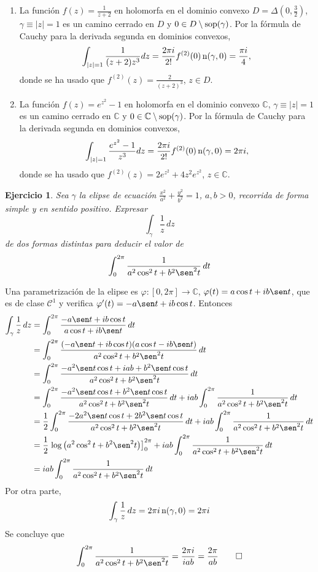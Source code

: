 \documentclass[11pt]{report}
\makeatletter
\renewenvironment{proof}[1][\proofname]{\par
  \pushQED{\qed}%
  \normalfont \topsep\z@skip %
  \trivlist
  \item[\hskip\labelsep
        \itshape
    #1\@addpunct{.}]\ignorespaces
}{%
  \popQED\endtrivlist\@endpefalse
}
\newcommand{\C}{\mathbb C}
\newtheorem{exercise}{Ejercicio}
\makeatother
\begin{document}
\begin{proof}
\hfill
\begin{enumerate}
    \item La función $f(z) = \frac{1}{z+2}$ en holomorfa en el dominio convexo $D =\Delta(0,\frac{3}{2})$, $\gamma \equiv |z| = 1$ es un camino cerrado en $D$ y $0 \in D \setminus \textup{sop}(\gamma)$. Por la fórmula de Cauchy para la derivada segunda en dominios convexos,
    \[\int_{|z| = 1} \frac{1}{(z+2)z^3} dz = \frac{2\pi i}{2!} f^{(2)}(0) \, \textup{n}(\gamma, 0) = \frac{\pi i}{4},\]
    donde se ha usado que $f^{(2)}(z) = \frac{2}{(z+2)^3}$, $z \in D$.
    \item La función $f(z) = e^{z^2}-1$ en holomorfa en el dominio convexo $\C$, $\gamma \equiv |z| = 1$ es un camino cerrado en $\C$ y $0 \in\C \setminus \textup{sop}(\gamma)$. Por la fórmula de Cauchy para la derivada segunda en dominios convexos,
    \[\int_{|z| = 1} \frac{e^{z^2}-1}{z^3} dz = \frac{2\pi i}{2!} f^{(2)}(0) \, \textup{n}(\gamma, 0) =2\pi i,\]
    donde se ha usado que $f^{(2)}(z) = 2e^{z^2}+4z^2e^{z^2}$, $z \in \C$. \qedhere
\end{enumerate}
\end{proof}

\begin{exercise}
Sea $\gamma$ la elipse de ecuación $\frac{x^2}{a^2}+\frac{y^2}{b^2} =1$, $a, b >0$, recorrida de forma simple y en sentido positivo. Expresar
\[\int_\gamma \frac{1}{z}\, dz\]
de dos formas distintas para deducir el valor de
\[\int_0^{2\pi} \frac{1}{a^2\cos^2t+b^2\sen^2t}\, dt\]
\end{exercise}

\begin{proof}
Una parametrización de la elipse es $\varphi \colon [0,2\pi] \to \C$, $\varphi(t) = a\cos t+ib\sen t$, que es de clase $\mathcal{C}^1$ y verifica $\varphi'(t) = -a\sen t+ib\cos t$. Entonces
\[
\begin{aligned}[t]
\int_\gamma \frac{1}{z} \, dz &=\int_0^{2\pi} \frac{-a\sen t+ib\cos t}{a\cos t +ib\sen t} \, dt \\ &= \int_0^{2\pi} \frac{(-a\sen t+ib\cos t)(a\cos t-ib\sen t)}{a^2\cos^2t+b^2\sen^2t} \, dt \\
&=\int_0^{2\pi} \frac{-a^2\sen t \cos t +iab+b^2\sen t \cos t}{a^2\cos^2t+b^2\sen^2t} \, dt \\ &= \int_0^{2\pi}\frac{-a^2\sen t\cos t+b^2\sen t \cos t}{a^2\cos^2t+b^2\sen^2t} \, dt+iab\int_0^{2\pi}\frac{1}{a^2\cos^2t+b^2\sen^2t} \, dt \\
&= \frac{1}{2}\int_0^{2\pi}\frac{-2a^2\sen t\cos t+2b^2\sen t \cos t}{a^2\cos^2t+b^2\sen^2t} \, dt+iab\int_0^{2\pi}\frac{1}{a^2\cos^2t+b^2\sen^2t} \, dt \\
&= \frac{1}{2}\left.\log\left(a^2\cos^2t+b^2\sen^2t\right)\right]_0^{2\pi}+iab\int_0^{2\pi}\frac{1}{a^2\cos^2t+b^2\sen^2t} \, dt \\
&= iab\int_0^{2\pi}\frac{1}{a^2\cos^2t+b^2\sen^2t} \, dt
\end{aligned}
\]
Por otra parte,
\[\int_\gamma \frac{1}{z}\, dz = 2\pi i \, \textup{n}(\gamma,0) = 2\pi i\]
Se concluye que
\[\int_0^{2\pi}\frac{1}{a^2\cos^2t+b^2\sen^2t}  = \frac{2\pi i}{iab} = \frac{2\pi}{ab} \qedhere\]
\end{proof}
\end{document}
